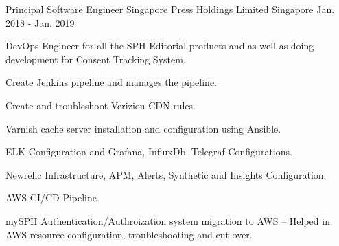 \begin{cventries}
  \cventry
      {Principal Software Engineer} %
      {Singapore Press Holdings Limited} %
      {Singapore} %
      {Jan. 2018 - Jan. 2019} %
      { %
        \begin{cvitems}
          \item {DevOps Engineer for all the SPH Editorial products and as well as doing development for Consent Tracking System.}
          \item {Create Jenkins pipeline and manages the pipeline.}
          \item {Create and troubleshoot Verizion CDN rules.}
          \item {Varnish cache server installation and configuration using Ansible.}
          \item {ELK Configuration and Grafana, InfluxDb, Telegraf Configurations.}
          \item {Newrelic Infrastructure, APM, Alerts, Synthetic and Insights Configuration.}
          \item {AWS CI/CD Pipeline.}
          \item {mySPH Authentication/Authroization system migration to AWS – Helped in AWS resource configuration, troubleshooting and cut over.}
        \end{cvitems}
      }



\end{cventries}

